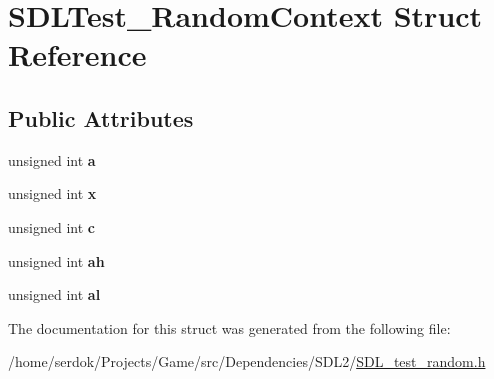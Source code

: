 \hypertarget{structSDLTest__RandomContext}{}\section{S\+D\+L\+Test\+\_\+\+Random\+Context Struct Reference}
\label{structSDLTest__RandomContext}
\subsection*{Public Attributes}
\begin{DoxyCompactItemize}
\item 
\mbox{\label{structSDLTest__RandomContext_a24f830d6cb476c96fbe325c99331e45f}} 
unsigned int {\bfseries a}
\item 
\mbox{\label{structSDLTest__RandomContext_a8bd6d1b4e1677ed1c06f5cc09f1af5b6}} 
unsigned int {\bfseries x}
\item 
\mbox{\label{structSDLTest__RandomContext_a17a6a7e7b68a33c67d9b74c8c7c33198}} 
unsigned int {\bfseries c}
\item 
\mbox{\label{structSDLTest__RandomContext_a2c8d2f1ee16cdfd38361b8f03b3fdb85}} 
unsigned int {\bfseries ah}
\item 
\mbox{\label{structSDLTest__RandomContext_a0e2bccd3611d383d6510c6c828aa54c4}} 
unsigned int {\bfseries al}
\end{DoxyCompactItemize}


The documentation for this struct was generated from the following file\+:\begin{DoxyCompactItemize}
\item 
/home/serdok/\+Projects/\+Game/src/\+Dependencies/\+S\+D\+L2/\hyperlink{SDL__test__random_8h}{S\+D\+L\+\_\+test\+\_\+random.\+h}\end{DoxyCompactItemize}
